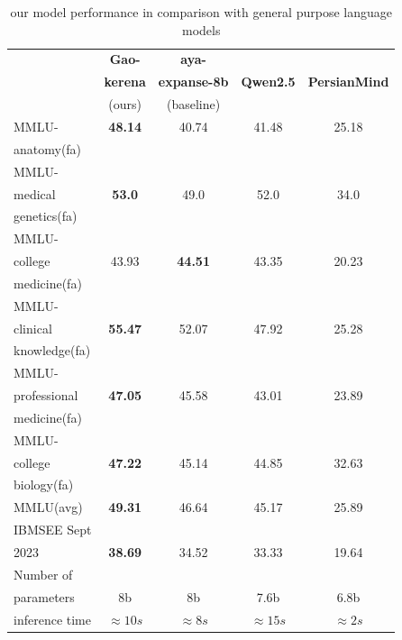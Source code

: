 \documentclass[conference]{IEEEtran}
\begin{document}
	\begin{table}[ht]
		\centering
		\caption{
			our model performance 
			in comparison with general purpose language models
		}
		\begin{tabular}{|l|c|c|c|c|}  %
			\hline
			\textbf{} & \textbf{Gao-} & \textbf{aya-} &  &  \\ 
			& \textbf{kerena} & \textbf{expanse-8b} & \textbf{Qwen2.5} & \textbf{PersianMind} \\
			& (ours) & (baseline) &  &  \\ \hline
			MMLU- & \textbf{48.14} & 40.74 & 41.48 & 25.18 \\ 
			anatomy(fa) &  &  &  &  \\ \hline
			MMLU- &  &  &  &  \\
			medical & \textbf{53.0} & 49.0 & 52.0 & 34.0 \\ 
			genetics(fa) &  &  &  &  \\ \hline
			MMLU- &  &  &  &  \\
			college & 43.93 & \textbf{44.51} & 43.35 & 20.23 \\
			medicine(fa) &  &  &  &  \\ \hline
			MMLU- &  &  &  &  \\
			clinical& \textbf{55.47} & 52.07 & 47.92 & 25.28 \\
			knowledge(fa)&  &  &  &  \\ \hline
			MMLU- &  &  &  &  \\
			professional& \textbf{47.05} & 45.58 & 43.01 & 23.89 \\ 
			medicine(fa)&  &  &  &  \\ \hline
			MMLU- &  &  &  &  \\
			college& \textbf{47.22} & 45.14 & 44.85 & 32.63 \\
			biology(fa)&  &  &  &  \\ \hline
			MMLU(avg) & \textbf{49.31} & 46.64 & 45.17 & 25.89 \\ \hline
			IBMSEE Sept &  &  &  &  \\ 
			2023 & \textbf{38.69} & 34.52 & 33.33 & 19.64 \\  \hline
			Number of&  &  &  &  \\
			parameters & 8b & 8b & 7.6b & 6.8b \\ \hline
			inference time & $\approx 10s$ & $\approx 8s$ & $\approx 15s$ & $\approx 2s$ \\  \hline
		\end{tabular}
		\label{tab:model_results_vs_general_purpose_languages}
	\end{table}
	
\end{document}
